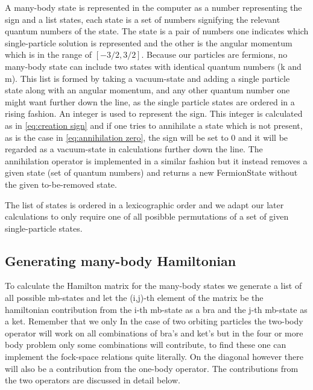 \documentclass[12pt,a4paper]{article}
\begin{document}
A many-body state is represented in the computer as a number representing the sign and a list states, each state is a set of numbers signifying the relevant quantum numbers of the state.
 The state is a pair of numbers one indicates which single-particle solution is represented and the other is the angular momentum which is in the range of $[-3/2,3/2]$.
 Because our particles are fermions, no many-body state can include two states with identical quantum numbers (k and m).
 This list is formed by taking a vacuum-state and adding a single particle state along with an angular momentum, and any other quantum number one might want further down the line, as the single particle states are ordered in a rising fashion. An integer is used to represent the sign. 
 This integer is calculated as in \ref{eq:creation sign} and if one tries to annihilate a state which is not present, as is the case in \ref{eq:annihilation zero}, the sign will be set to 0 and it will be regarded as a vacuum-state in calculations further down the line.
 The annihilation operator is implemented in a similar fashion but it instead removes a given state (set of quantum numbers) and returns a new FermionState without the given to-be-removed state.
 
 The list of states is ordered in a lexicographic order and we adapt our later calculations to only require one of all posibble permutations of a set of given single-particle states.
 
 
\subsection{Generating many-body Hamiltonian}
To calculate the Hamilton matrix for the many-body states we generate a list of all possible mb-states and let the (i,j)-th element of the matrix be the hamiltonian contribution from the i-th mb-state as a bra and the j-th mb-state as a ket. 
 Remember that we only 
 In the case of two  orbiting particles the two-body operator will work on all combinations of bra's and ket's but in the four or more body problem only some combinations will contribute, to find these one can implement the fock-space relations quite literally. 
 On the diagonal however there will also be a contribution from the one-body operator.
 The contributions from the two operators are discussed in detail below.
\end{document}
